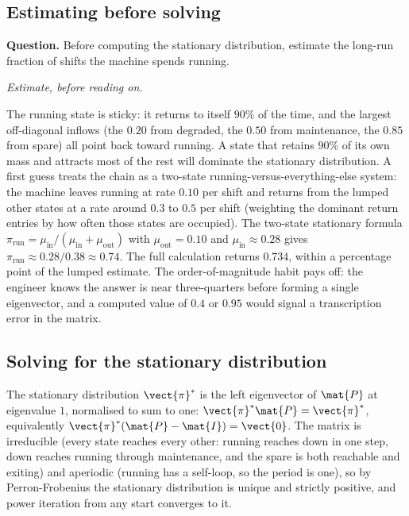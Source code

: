 \subsection{Estimating before solving}

\begin{estimation}
\textbf{Question.} Before computing the stationary distribution,
estimate the long-run fraction of shifts the machine spends running.

\smallskip
\textit{Estimate, before reading on.}

\smallskip
The running state is sticky: it returns to itself $90\%$ of the time,
and the largest off-diagonal inflows (the $0.20$ from degraded, the
$0.50$ from maintenance, the $0.85$ from spare) all point back toward
running. A state that retains $90\%$ of its own mass and attracts most
of the rest will dominate the stationary distribution. A first guess
treats the chain as a two-state running-versus-everything-else system:
the machine leaves running at rate $0.10$ per shift and returns from
the lumped other states at a rate around $0.3$ to $0.5$ per shift
(weighting the dominant return entries by how often those states are
occupied). The two-state stationary formula $\pi_{\text{run}} =
\mu_{\text{in}}/(\mu_{\text{in}} + \mu_{\text{out}})$ with
$\mu_{\text{out}} = 0.10$ and $\mu_{\text{in}} \approx 0.28$ gives
$\pi_{\text{run}} \approx 0.28/0.38 \approx 0.74$. The full
calculation returns $0.734$, within a percentage point of the lumped
estimate. The order-of-magnitude habit pays off: the engineer knows
the answer is near three-quarters before forming a single eigenvector,
and a computed value of $0.4$ or $0.95$ would signal a transcription
error in the matrix.
\end{estimation}

\subsection{Solving for the stationary distribution}

The stationary distribution $\vect{\pi}^{*}$ is the left eigenvector
of $\mat{P}$ at eigenvalue $1$, normalised to sum to one:
$\vect{\pi}^{*}\mat{P} = \vect{\pi}^{*}$, equivalently
$\vect{\pi}^{*}(\mat{P} - \mat{I}) = \vect{0}$. The matrix is
irreducible (every state reaches every other: running reaches down in
one step, down reaches running through maintenance, and the spare is
both reachable and exiting) and aperiodic (running has a self-loop, so
the period is one), so by Perron-Frobenius the stationary distribution
is unique and strictly positive, and power iteration from any start
converges to it.

